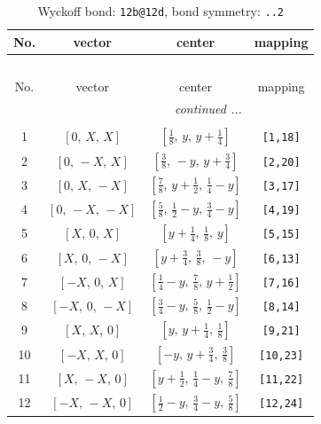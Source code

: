 \documentclass[fleqn,8pt]{jsarticle}
\begin{document}
\renewcommand{\arraystretch}{1.2}
\begin{longtable}{cccc}
\caption{Wyckoff bond: {\tt 12b@12d}, bond symmetry: {\tt ..2}}
 \\
 \hline \hline
No. & vector & center & mapping \\ \hline \endfirsthead

\multicolumn{3}{l}{\tablename\ \thetable{}} \\
 \hline \hline
No. & vector & center & mapping \\ \hline \endhead

 \hline \hline
\multicolumn{3}{r}{\footnotesize\it continued ...} \\ \endfoot

 \hline \hline
\multicolumn{3}{r}{} \\ \endlastfoot

1 & $\left[ 0,\, X,\, X \right]$ & $\left[ \frac{1}{8},\, y,\, y + \frac{1}{4} \right]$ & {\tt [1,18]} \\ \hline
2 & $\left[ 0,\, - X,\, X \right]$ & $\left[ \frac{3}{8},\, - y,\, y + \frac{3}{4} \right]$ & {\tt [2,20]} \\ \hline
3 & $\left[ 0,\, X,\, - X \right]$ & $\left[ \frac{7}{8},\, y + \frac{1}{2},\, \frac{1}{4} - y \right]$ & {\tt [3,17]} \\ \hline
4 & $\left[ 0,\, - X,\, - X \right]$ & $\left[ \frac{5}{8},\, \frac{1}{2} - y,\, \frac{3}{4} - y \right]$ & {\tt [4,19]} \\ \hline
5 & $\left[ X,\, 0,\, X \right]$ & $\left[ y + \frac{1}{4},\, \frac{1}{8},\, y \right]$ & {\tt [5,15]} \\ \hline
6 & $\left[ X,\, 0,\, - X \right]$ & $\left[ y + \frac{3}{4},\, \frac{3}{8},\, - y \right]$ & {\tt [6,13]} \\ \hline
7 & $\left[ - X,\, 0,\, X \right]$ & $\left[ \frac{1}{4} - y,\, \frac{7}{8},\, y + \frac{1}{2} \right]$ & {\tt [7,16]} \\ \hline
8 & $\left[ - X,\, 0,\, - X \right]$ & $\left[ \frac{3}{4} - y,\, \frac{5}{8},\, \frac{1}{2} - y \right]$ & {\tt [8,14]} \\ \hline
9 & $\left[ X,\, X,\, 0 \right]$ & $\left[ y,\, y + \frac{1}{4},\, \frac{1}{8} \right]$ & {\tt [9,21]} \\ \hline
10 & $\left[ - X,\, X,\, 0 \right]$ & $\left[ - y,\, y + \frac{3}{4},\, \frac{3}{8} \right]$ & {\tt [10,23]} \\ \hline
11 & $\left[ X,\, - X,\, 0 \right]$ & $\left[ y + \frac{1}{2},\, \frac{1}{4} - y,\, \frac{7}{8} \right]$ & {\tt [11,22]} \\ \hline
12 & $\left[ - X,\, - X,\, 0 \right]$ & $\left[ \frac{1}{2} - y,\, \frac{3}{4} - y,\, \frac{5}{8} \right]$ & {\tt [12,24]} \\
\end{longtable}
\end{document}
